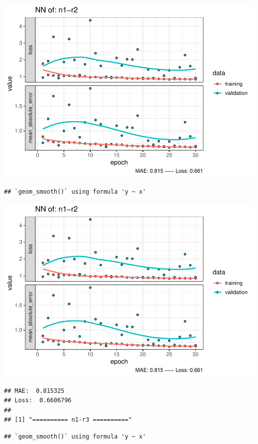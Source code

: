 \documentclass[
]{article}
\begin{document}
\includegraphics{project-code_files/figure-latex/unnamed-chunk-18-13.pdf}

\begin{verbatim}
## `geom_smooth()` using formula 'y ~ x'
\end{verbatim}

\includegraphics{project-code_files/figure-latex/unnamed-chunk-18-14.pdf}

\begin{verbatim}
## MAE:  0.815325
## Loss:  0.6606796 
## 
## [1] "========== n1-r3 =========="
\end{verbatim}

\begin{verbatim}
## `geom_smooth()` using formula 'y ~ x'
\end{verbatim}
\end{document}
